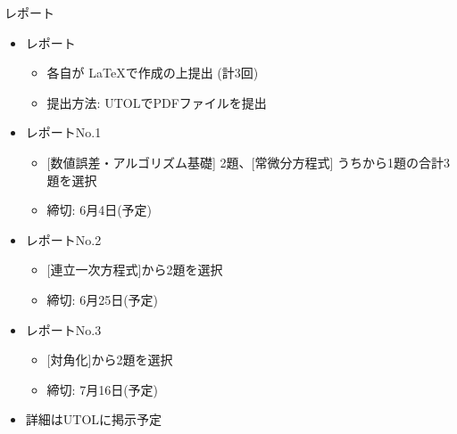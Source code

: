 \begin{frame}[t,fragile]{レポート}
  \begin{itemize}
  \item レポート
    \begin{itemize}
    \item 各自が \LaTeX で作成の上提出 (計3回)
    \item 提出方法: UTOLでPDFファイルを提出
    \end{itemize}
  \item レポートNo.1
    \begin{itemize}
    \item \mbox{} [数値誤差・アルゴリズム基礎] 2題、[常微分方程式] うちから1題の合計3題を選択
    \item 締切: 6月4日(予定)
    \end{itemize}
  \item レポートNo.2
    \begin{itemize}
    \item \mbox{} [連立一次方程式]から2題を選択
    \item 締切: 6月25日(予定)
    \end{itemize}
  \item レポートNo.3
    \begin{itemize}
    \item \mbox{} [対角化]から2題を選択
    \item 締切: 7月16日(予定)
    \end{itemize}
  \item 詳細はUTOLに掲示予定
  \end{itemize}    
\end{frame}

